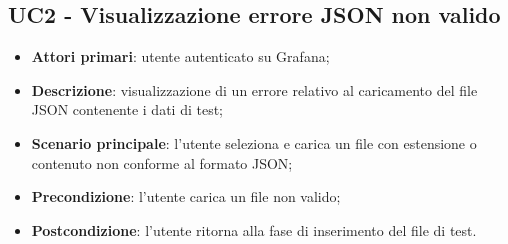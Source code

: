 \subsection{UC2 - Visualizzazione errore JSON non valido}
\begin{itemize}
	\item \textbf{Attori primari}: utente autenticato su Grafana;
	\item \textbf{Descrizione}: visualizzazione di un errore relativo al caricamento del file JSON contenente i dati di test;
	\item \textbf{Scenario principale}: l'utente seleziona e carica un file con estensione o contenuto non conforme al formato JSON;
	\item \textbf{Precondizione}: l'utente carica un file non valido;
	\item \textbf{Postcondizione}: l'utente ritorna alla fase di inserimento del file di test.
\end{itemize}
